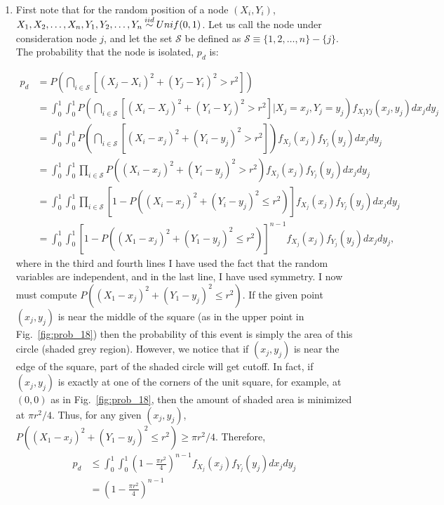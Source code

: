 \begin{problem}{18} $ $
\begin{enumerate}

\item First note that for the random position of a node $(X_i, Y_i)$, $X_1, X_2, \ldots, X_n, Y_1, Y_2, \ldots, Y_n \distas{iid} Unif(0, 1)$.  Let us call the node under consideration node $j$, and let the set $\mathcal S$ be defined as $\mathcal S \equiv \{1, 2, \ldots, n \}-\{j\}$.  The probability that the node is isolated, $p_d$ is:

\begin{align*}
p_d &= P\left(\bigcap_{i \in \mathcal S}\left  [(X_j-X_i)^2+(Y_j-Y_i)^2>r^2 \right] \right) \\
& = \int_0^1 \int_0^1 P\left(\bigcap_{i \in \mathcal S}\left  [(X_i-X_j)^2+(Y_i-Y_j)^2>r^2 \right]  \Big |X_j=x_j, Y_j=y_j\right)f_{X_jYj}(x_j,y_j) dx_j dy_j \\
& = \int_0^1 \int_0^1 P\left(\bigcap_{i \in \mathcal S}\left  [(X_i-x_j)^2+(Y_i-y_j)^2>r^2 \right]  \right)f_{X_j}(x_j) f_{Y_j}(y_j) dx_j dy_j \\
& =  \int_0^1 \int_0^1 \prod_{i \in \mathcal S} P\left((X_i-x_j)^2+(Y_i-y_j)^2>r^2  \right)f_{X_j}(x_j) f_{Y_j}(y_j) dx_j dy_j \\
& =  \int_0^1 \int_0^1 \prod_{i \in \mathcal S} \left[1-P\left((X_i-x_j)^2+(Y_i-y_j)^2 \le r^2  \right)\right]f_{X_j}(x_j) f_{Y_j}(y_j) dx_j dy_j \\
& =  \int_0^1 \int_0^1 \left[1-P\left((X_1-x_j)^2+(Y_1-y_j)^2 \le r^2  \right)\right]^{n-1} f_{X_j}(x_j) f_{Y_j}(y_j) dx_j dy_j,
\end{align*}
where in the third and fourth lines I have used the fact that the random variables are independent, and in the last line, I have used symmetry.  I now must compute $P((X_1-x_j)^2+(Y_1-y_j)^2 \le r^2 )$.  If the given point $(x_j, y_j)$ is near the middle of the square (as in the upper point in Fig.~\ref{fig:prob_18}) then the probability of this event is simply the area of this circle (shaded grey region).  However, we notice that if $(x_j, y_j)$ is near the edge of the square, part of the shaded circle will get cutoff.  In fact, if $(x_j, y_j)$ is exactly at one of the corners of the unit square, for example, at $(0,0)$ as in Fig.~\ref{fig:prob_18}, then the amount of shaded area is minimized at $\pi r^2/4$.  Thus, for any given $(x_j, y_j)$, $P((X_1-x_j)^2+(Y_1-y_j)^2 \le r^2 ) \ge \pi r^2/4$.  Therefore,
\begin{align*}
p_d & \le \int_0^1 \int_0^1 \left(1-\frac{\pi r^2}{4}\right)^{n-1} f_{X_j}(x_j) f_{Y_j}(y_j) dx_j dy_j \\
&= \left(1-\frac{\pi r^2}{4}\right)^{n-1}
\end{align*}


\end{enumerate}
\end{problem}
